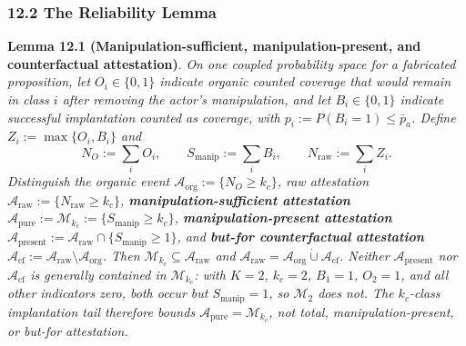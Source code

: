 \documentclass[
  11pt]{article}
\begin{document}
\subsubsection{12.2 The Reliability Lemma}\label{the-reliability-lemma}

\textbf{Lemma 12.1 (Manipulation-sufficient, manipulation-present, and
counterfactual attestation)}. \emph{On one coupled probability space for
a fabricated proposition, let \(O_i\in\{0,1\}\) indicate organic counted
coverage that would remain in class \(i\) after removing the actor's
manipulation, and let \(B_i\in\{0,1\}\) indicate successful implantation
counted as coverage, with \(p_i:=P(B_i=1)\le\bar p_a\). Define
\(Z_i:=\max\{O_i,B_i\}\) and}
\[N_O:=\sum_iO_i,\qquad S_{\mathrm{manip}}:=\sum_iB_i,\qquad N_{\mathrm{raw}}:=\sum_iZ_i.\]
\emph{Distinguish the organic event
\(\mathcal A_{\mathrm{org}}:=\{N_O\ge k_c\}\), raw attestation
\(\mathcal A_{\mathrm{raw}}:=\{N_{\mathrm{raw}}\ge k_c\}\),
\textbf{manipulation-sufficient attestation}
\(\mathcal A_{\mathrm{pure}}:=\mathcal M_{k_c}:=\{S_{\mathrm{manip}}\ge k_c\}\),
\textbf{manipulation-present attestation}
\(\mathcal A_{\mathrm{present}}:=\mathcal A_{\mathrm{raw}}\cap\{S_{\mathrm{manip}}\ge1\}\),
and \textbf{but-for counterfactual attestation}
\(\mathcal A_{\mathrm{cf}}:=\mathcal A_{\mathrm{raw}}\setminus\mathcal A_{\mathrm{org}}\).
Then \(\mathcal M_{k_c}\subseteq\mathcal A_{\mathrm{raw}}\) and
\(\mathcal A_{\mathrm{raw}}=\mathcal A_{\mathrm{org}}\mathbin{\dot\cup}\mathcal A_{\mathrm{cf}}\).
Neither \(\mathcal A_{\mathrm{present}}\) nor
\(\mathcal A_{\mathrm{cf}}\) is generally contained in
\(\mathcal M_{k_c}\): with \(K=2\), \(k_c=2\), \(B_1=1\), \(O_2=1\), and
all other indicators zero, both occur but \(S_{\mathrm{manip}}=1\), so
\(\mathcal M_2\) does not. The \(k_c\)-class implantation tail therefore
bounds \(\mathcal A_{\mathrm{pure}}=\mathcal M_{k_c}\), not total,
manipulation-present, or but-for attestation.}
\end{document}
